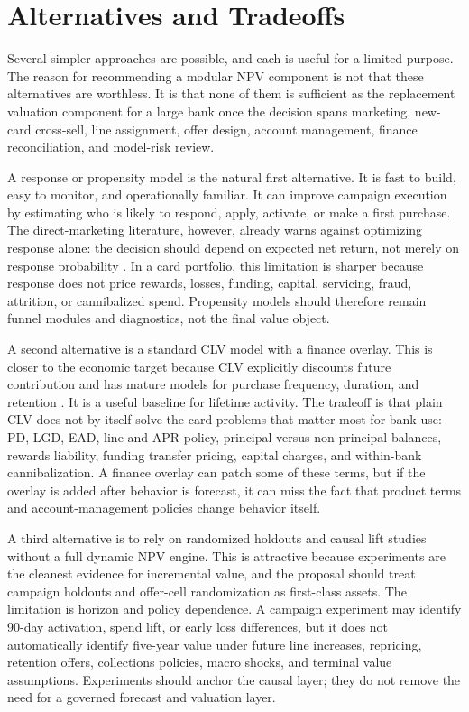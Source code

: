 \documentclass[11pt]{article}
\newcommand{\1}{\mathbf{1}}
\begin{document}
\section{Alternatives and Tradeoffs}
\label{sec:alternatives-tradeoffs}

Several simpler approaches are possible, and each is useful for a limited
purpose. The reason for recommending a modular NPV component is not that these
alternatives are worthless. It is that none of them is sufficient as the
replacement valuation component for a large bank once the decision spans
marketing, new-card cross-sell, line assignment, offer design, account
management, finance reconciliation, and model-risk review.

A response or propensity model is the natural first alternative. It is fast to
build, easy to monitor, and operationally familiar. It can improve campaign
execution by estimating who is likely to respond, apply, activate, or make a
first purchase. The direct-marketing literature, however, already warns against
optimizing response alone: the decision should depend on expected net return,
not merely on response probability \citep{bult1995directmail}. In a card
portfolio, this limitation is sharper because response does not price rewards,
losses, funding, capital, servicing, fraud, attrition, or cannibalized spend.
Propensity models should therefore remain funnel modules and diagnostics, not
the final value object.

A second alternative is a standard CLV model with a finance overlay. This is
closer to the economic target because CLV explicitly discounts future
contribution and has mature models for purchase frequency, duration, and
retention \citep{berger1998clv,rust2004return,venkatesan2004clv,
schmittlein1987counting,fader2005bgnbd}. It is a useful baseline for lifetime
activity. The tradeoff is that plain CLV does not by itself solve the card
problems that matter most for bank use: PD, LGD, EAD, line and APR policy,
principal versus non-principal balances, rewards liability, funding transfer
pricing, capital charges, and within-bank cannibalization. A finance overlay
can patch some of these terms, but if the overlay is added after behavior is
forecast, it can miss the fact that product terms and account-management
policies change behavior itself.

A third alternative is to rely on randomized holdouts and causal lift studies
without a full dynamic NPV engine. This is attractive because experiments are
the cleanest evidence for incremental value, and the proposal should treat
campaign holdouts and offer-cell randomization as first-class assets. The
limitation is horizon and policy dependence. A campaign experiment may
identify 90-day activation, spend lift, or early loss differences, but it does
not automatically identify five-year value under future line increases,
repricing, retention offers, collections policies, macro shocks, and terminal
value assumptions. Experiments should anchor the causal layer; they do not
remove the need for a governed forecast and valuation layer.
\end{document}
